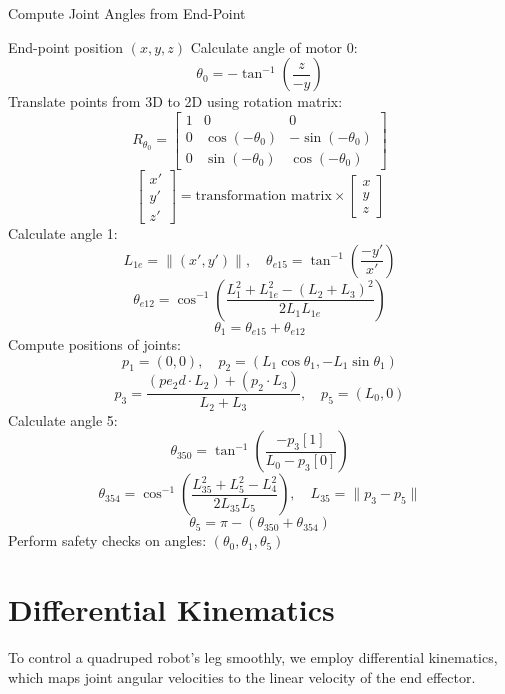 \documentclass[a4paper,11pt]{article}
\begin{document}
\begin{algorithm}[H]
	\caption{Compute Joint Angles from End-Point}
	\begin{algorithmic}[1]
			\Require End-point position $(x, y, z)$
			\State Calculate angle of motor 0:
			\[
				\theta_0 = -\tan^{-1} \left( \frac{z}{-y} \right)
			\]
			\State Translate points from 3D to 2D using rotation matrix:
			\[
				R_{\theta_0} =
					\begin{bmatrix}
							1 & 0 & 0 \\
							0 & \cos(-\theta_0) & -\sin(-\theta_0) \\
							0 & \sin(-\theta_0) & \cos(-\theta_0)
					\end{bmatrix}
			\]
			\[
				\begin{bmatrix} x' \\ y' \\ z' \end{bmatrix} = \text{transformation matrix} \times \begin{bmatrix} x \\ y \\ z \end{bmatrix}
			\]
			\State Calculate angle 1:
			\[
					L_{1e} = \| (x', y') \|, \quad
					\theta_{e15} = \tan^{-1} \left( \frac{-y'}{x'} \right)
			\]
			\[
					\theta_{e12} = \cos^{-1} \left( \frac{L_1^2 + L_{1e}^2 - (L_2 + L_3)^2}{2 L_1 L_{1e}} \right)
			\]
			\[
					\theta_1 = \theta_{e15} + \theta_{e12}
			\]
			\State Compute positions of joints:
			\[
					p_1 = (0, 0), \quad
					p_2 = (L_1 \cos \theta_1, -L_1 \sin \theta_1)
			\]
			\[
					p_3 = \frac{(pe_2d \cdot L_2) + (p_2 \cdot L_3)}{L_2 + L_3}, \quad
					p_5 = (L_0, 0)
			\]
			\State Calculate angle 5:
			\[
				\theta_{350} = \tan^{-1} \left( \frac{-p_3[1]}{L_0 - p_3[0]} \right)
			\]
			\[
					\theta_{354} = \cos^{-1} \left( \frac{L_{35}^2 + L_5^2 - L_4^2}{2 L_{35} L_5} \right), \quad
					L_{35} = \| p_3 - p_5 \|
			\]
			\[
					\theta_5 = \pi - (\theta_{350} + \theta_{354})
			\]
			\State Perform safety checks on angles:
			\State \Return $(\theta_0, \theta_1, \theta_5)$
	\end{algorithmic}
\end{algorithm}

\section*{Differential Kinematics}

To control a quadruped robot's leg smoothly, we employ differential kinematics, which maps joint angular velocities to the linear velocity of the end effector.
\end{document}
